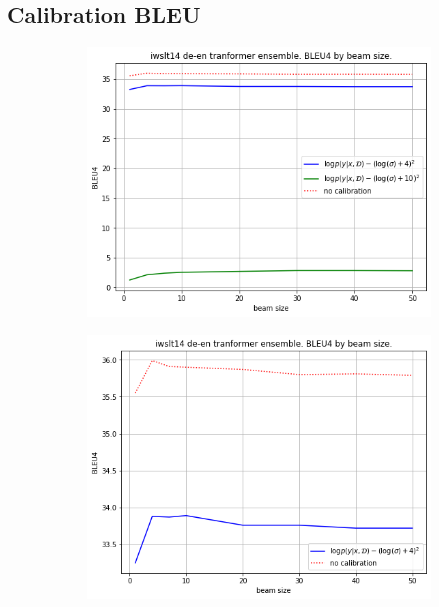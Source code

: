 \documentclass[a4paper,14pt]{extarticle}
\begin{document}
\subsection{Calibration BLEU}
	\begin{figure}[t]
		\begin{subfigure}{.5\textwidth}
			\includegraphics[width=\textwidth]{images/calibratin_bleu_all.png}
			\center{\caption{}}
		\end{subfigure}
		\begin{subfigure}{.5\textwidth}
			\includegraphics[width=\textwidth]{images/calibration_bleu_best.png}
			\center{\caption{}}
		\end{subfigure}
	\end{figure}
	
\end{document}
